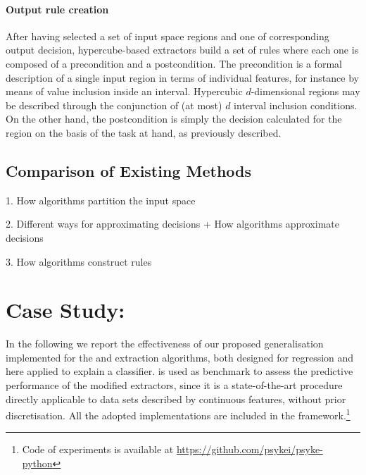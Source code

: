 \documentclass[
]{ceurart}
\begin{document}
\paragraph{Output rule creation}

After having selected a set of input space regions and one of corresponding output decision, hypercube-based extractors build a set of rules where each one is composed of a precondition and a postcondition.
%
The precondition is a formal description of a single input region in terms of individual features, for instance by means of value inclusion inside an interval.
%
Hypercubic $d$-dimensional regions may be described through the conjunction of (at most) $d$ interval inclusion conditions.
%
On the other hand, the postcondition is simply the decision calculated for the region on the basis of the task at hand, as previously described.

\subsection{Comparison of Existing Methods}


1. How algorithms partition the input space

2. Different ways for approximating decisions
    + How algorithms approximate decisions

3. How algorithms construct rules

\section{Case Study: \psyke}\label{sec:experiments}


In the following we report the effectiveness of our proposed generalisation implemented for the \iter{} and \gridex{} extraction algorithms, both designed for regression and here applied to explain a classifier.
%
\cart{} is used as benchmark to assess the predictive performance of the modified extractors, since it is a state-of-the-art procedure directly applicable to data sets described by continuous features, without prior discretisation.
%
All the adopted implementations are included in the \psyke{} framework.\footnote{Code of experiments is available at \url{https://github.com/psykei/psyke-python}}
\end{document}
